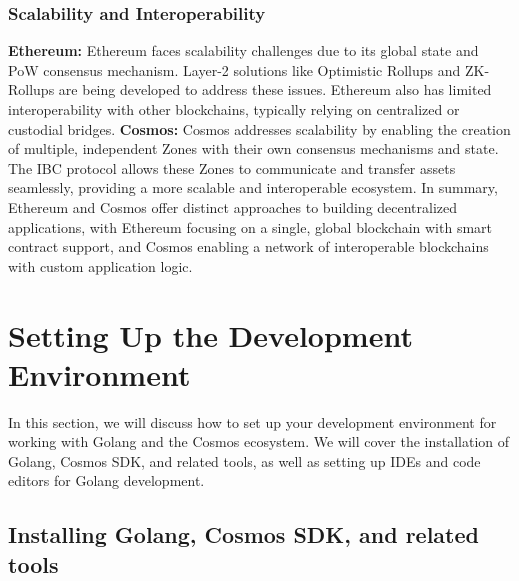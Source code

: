 \documentclass{article}
\begin{document}
\subsubsection{Scalability and Interoperability}
%
\textbf{Ethereum:} Ethereum faces scalability challenges due to its global state and PoW consensus mechanism. Layer-2 solutions like Optimistic Rollups and ZK-Rollups are being developed to address these issues. Ethereum also has limited interoperability with other blockchains, typically relying on centralized or custodial bridges.
%
\textbf{Cosmos:} Cosmos addresses scalability by enabling the creation of multiple, independent Zones with their own consensus mechanisms and state. The IBC protocol allows these Zones to communicate and transfer assets seamlessly, providing a more scalable and interoperable ecosystem.
%
In summary, Ethereum and Cosmos offer distinct approaches to building decentralized applications, with Ethereum focusing on a single, global blockchain with smart contract support, and Cosmos enabling a network of interoperable blockchains with custom application logic.
%
%
\section{Setting Up the Development Environment}

In this section, we will discuss how to set up your development environment for working with Golang and the Cosmos ecosystem. We will cover the installation of Golang, Cosmos SDK, and related tools, as well as setting up IDEs and code editors for Golang development.

\subsection{Installing Golang, Cosmos SDK, and related tools}
\end{document}
